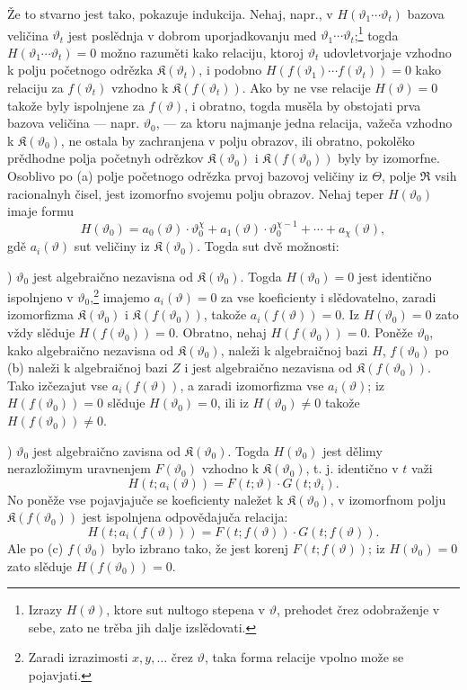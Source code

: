 \documentclass[11pt]{article}
\providecommand{\Kfield}{\mathfrak K}
\providecommand{\Rfield}{\mathfrak R}
\begin{document}
Že to stvarno jest tako, pokazuje indukcija. Nehaj, napr., v \(H(\vartheta_1\cdots\vartheta_t)\) bazova veličina \(\vartheta_t\) jest poslědnja v dobrom uporjadkovanju med \(\vartheta_1\cdots\vartheta_t\);\footnote{Izrazy \(H(\vartheta)\), ktore sut nultogo stepena v \(\vartheta\), prehodet črez odobraženje v sebe, zato ne trěba jih dalje izslědovati.} togda \(H(\vartheta_1\cdots\vartheta_t)=0\) možno razuměti kako relaciju, ktoroj \(\vartheta_t\) udovletvorjaje vzhodno k polju početnogo odrězka \(\Kfield(\vartheta_t)\), i podobno \(H(f(\vartheta_1)\cdots f(\vartheta_t))=0\) kako relaciju za \(f(\vartheta_t)\) vzhodno k \(\Kfield(f(\vartheta_t))\). Ako by ne vse relacije \(H(\vartheta)=0\) takože byly ispolnjene za \(f(\vartheta)\), i obratno, togda musěla by obstojati prva bazova veličina --- napr. \(\vartheta_0\), --- za ktoru najmanje jedna relacija, važeča vzhodno k \(\Kfield(\vartheta_0)\), ne ostala by zachranjena v polju obrazov, ili obratno, pokolěko prědhodne polja početnyh odrězkov \(\Kfield(\vartheta_0)\) i \(\Kfield(f(\vartheta_0))\) byly by izomorfne. Osoblivo po (a) polje početnogo odrězka prvoj bazovoj veličiny iz \(\Theta\), polje \(\Rfield\) vsih racionalnyh čisel, jest izomorfno svojemu polju obrazov. Nehaj teper \(H(\vartheta_0)\) imaje formu
\[
H(\vartheta_0)=a_0(\vartheta)\cdot\vartheta_0^\chi
+a_1(\vartheta)\cdot\vartheta_0^{\chi-1}+\cdots+a_\chi(\vartheta),
\]
gdě \(a_i(\vartheta)\) sut veličiny iz \(\Kfield(\vartheta_0)\). Togda sut dvě možnosti:

) \(\vartheta_0\) jest algebraično nezavisna od \(\Kfield(\vartheta_0)\). Togda \(H(\vartheta_0)=0\) jest identično ispolnjeno v \(\vartheta_0\),\footnote{Zaradi izrazimosti \(x,y,\ldots\) črez \(\vartheta\), taka forma relacije vpolno može se pojavjati.} imajemo \(a_i(\vartheta)=0\) za vse koeficienty i slědovatelno, zaradi izomorfizma \(\Kfield(\vartheta_0)\) i \(\Kfield(f(\vartheta_0))\), takože \(a_i(f(\vartheta))=0\). Iz \(H(\vartheta_0)=0\) zato vždy slěduje \(H(f(\vartheta_0))=0\). Obratno, nehaj \(H(f(\vartheta_0))=0\). Poněže \(\vartheta_0\), kako algebraično nezavisna od \(\Kfield(\vartheta_0)\), naleži k algebraičnoj bazi \(H\), \(f(\vartheta_0)\) po (b) naleži k algebraičnoj bazi \(Z\) i jest algebraično nezavisna od \(\Kfield(f(\vartheta_0))\). Tako izčezajut vse \(a_i(f(\vartheta))\), a zaradi izomorfizma vse \(a_i(\vartheta)\); iz \(H(f(\vartheta_0))=0\) slěduje \(H(\vartheta_0)=0\), ili iz \(H(\vartheta_0)\ne0\) takože \(H(f(\vartheta_0))\ne0\).

) \(\vartheta_0\) jest algebraično zavisna od \(\Kfield(\vartheta_0)\). Togda \(H(\vartheta_0)\) jest dělimy nerazložimym uravnenjem \(F(\vartheta_0)\) vzhodno k \(\Kfield(\vartheta_0)\), t. j. identično v \(t\) važi
\[
H(t;a_i(\vartheta))=F(t;\vartheta)\cdot G(t;\vartheta_i).
\]
No poněže vse pojavjajuče se koeficienty naležet k \(\Kfield(\vartheta_0)\), v izomorfnom polju \(\Kfield(f(\vartheta_0))\) jest ispolnjena odpovědajuča relacija:
\[
H(t;a_i(f(\vartheta)))=F(t;f(\vartheta))\cdot G(t;f(\vartheta)).
\]
Ale po (c) \(f(\vartheta_0)\) bylo izbrano tako, že jest korenj \(F(t;f(\vartheta))\); iz \(H(\vartheta_0)=0\) zato slěduje \(H(f(\vartheta_0))=0\).
\end{document}

